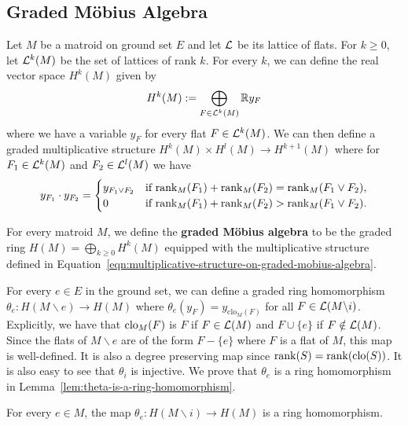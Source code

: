 \documentclass{puthesis-UG}
\begin{document}
\subsection{Graded M\"obius Algebra}

Let $M$ be a matroid on ground set $E$ and let $\mathcal{L}$ be its lattice of flats. For $k \geq 0$, let $\mathcal{L}^k(M)$ be the set of lattices of rank $k$. For every $k$, we can define the real vector space $H^k(M)$ given by 
\[
	H^k(M) := \bigoplus_{F \in \mathcal{L}^k(M)} \mathbb{R} y_F
\]
where we have a variable $y_F$ for every flat $F \in \mathcal{L}^k(M)$. We can then define a graded multiplicative structure $H^k(M) \times H^l(M) \to H^{k+1}(M)$ where for $F_1 \in \mathcal{L}^k(M)$ and $F_2 \in \mathcal{L}^l(M)$ we have 
\begin{equation}\label{eqn:multiplicative-structure-on-graded-mobius-algebra}
	y_{F_1} \cdot y_{F_2} = 
	\begin{cases}
		y_{F_1 \vee F_2} & \text{if $\operatorname{rank}_M(F_1) + \operatorname{rank}_M(F_2) = \operatorname{rank}_M(F_1 \vee F_2)$}, \\
		0 & \text{if $\operatorname{rank}_M(F_1) + \operatorname{rank}_M(F_2) > \operatorname{rank}_M(F_1 \vee F_2)$}.
	\end{cases} 
\end{equation}
\begin{defn}
	For every matroid $M$, we define the \textbf{graded M\"obius algebra} to be the graded ring $H(M) = \bigoplus_{k \geq 0} H^k(M)$ equipped with the multiplicative structure defined in Equation~\ref{eqn:multiplicative-structure-on-graded-mobius-algebra}. 
\end{defn}
For every $e \in E$ in the ground set, we can define a graded ring homomorphism $\theta_e : H(M \backslash e) \to H(M)$ where $\theta_e (y_F) = y_{\text{clo}_M(F)}$ for all $F \in \mathcal{L}(M \backslash i)$. Explicitly, we have that $\operatorname{clo}_M(F)$ is $F$ if $F \in \mathcal{L}(M)$ and $F \cup \{e\}$ if $F \notin \mathcal{L}(M)$. Since the flats of $M \backslash e$ are of the form $F - \{e\}$ where $F$ is a flat of $M$, this map is well-defined. It is also a degree preserving map since $\operatorname{rank} (S) = \operatorname{rank} (\operatorname{clo}(S))$. It is also easy to see that $\theta_i$ is injective. We prove that $\theta_e$ is a ring homomorphism in Lemma~\ref{lem:theta-is-a-ring-homomorphism}. 

\begin{lem}\label{lem:theta-is-a-ring-homomorphism}
	For every $e \in M$, the map $\theta_e : H(M \backslash i) \to H(M)$ is a ring homomorphism. 
\end{lem}
\end{document}
